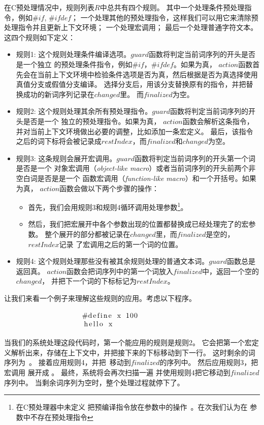 在C预处理情况中，规则列表$R$中总共有四个规则。
其中一个处理条件预处理指令，例如$\#if$, $\#ifdef$；
一个处理其他的预处理指令，这样我们可以用它来清除预处理指令并且更新上下文环境；
一个处理宏调用；
最后一个处理普通字符文本。
这四个规则如下定义：

\begin{itemize}
\item 规则1: 这个规则处理条件编译选项。$guard$函数将判定当前词序列的开头是否是一个独立
  的预处理条件指令，例如$\#if$，$\#ifdef$。如果为真，
  $action$函数首先会在当前上下文环境中检验条件选项是否为真，然后根据是否为真选择使用
  真值分支或假值分支编译。
  选择分支后，用该分支替换原有的指令，并把替换成功的新词序列记录在$changed$里。
  而$finalized$为空。
\item 规则2: 这个规则处理其余所有预处理指令。$guard$函数将判定当前词序列的开头是否是一个
  独立的预处理指令。如果为真，
  $action$函数会解析这条指令，并对当前上下文环境做出必要的调整，比如添加一条宏定义。
  最后，该指令之后的词下标将会被记录成$restIndex$，而$finalized$和$changed$为空。
\item 规则3: 这条规则会展开宏调用。$guard$函数将判定当前词序列的开头第一个词是否是一个
  对象宏调用（\emph{object-like macro}）或者当前词序列的开头前两个非空白词是否是是一个
  函数宏调用（\emph{function-like macro}）和一个开括号。如果为真，
  $action$函数会做以下两个步骤的操作：
  \begin{itemize}
  \item 首先，我们会用规则3和规则4循环调用处理参数\footnote{在C预处理器中未定义
    把预编译指令放在参数中的操作~\parencite{CStandard}。在次我们认为在
    参数中不存在预处理指令}。
  \item 然后，我们把宏展开中各个参数出现的位置都替换成已经处理完了的宏参数。
    整个展开的部分都被记录在$changed$里，而$finalized$是空的，$restIndex$记录
    了宏调用之后的第一个词的位置。
  \end{itemize}
\item 规则4: 这个规则处理那些没有被其余规则处理的普通文本词。$guard$函数总是返回真。
  $action$函数会把词序列中的第一个词放入$finalized$中，返回一个空的$changed$，
  并把下一个词的下标标记为$restIndex$。
\end{itemize}

让我们来看一个例子来理解这些规则的应用。考虑以下程序。
\begin{equation}
\begin{minipage}{0.4\columnwidth}
\begin{lstlisting}
#define x 100
hello x
\end{lstlisting}
\end{minipage}
\label{eqn:smallexample}
\end{equation}
当我们的系统处理这段代码时，第一个能应用的规则是规则2。
它会把第一个宏定义解析出来，存储在上下文中，并把接下来的下标移动到下一行。
这时剩余的词序列为~。
接着应用规则4，并把~移动到$finalized$的序列中。
然后应用规则3，把宏调用  展开成 。
最终，系统将会再次扫描一遍  并使用规则4把它移动到$finalized$序列中。
当剩余词序列为空时，整个处理过程就停下了。

